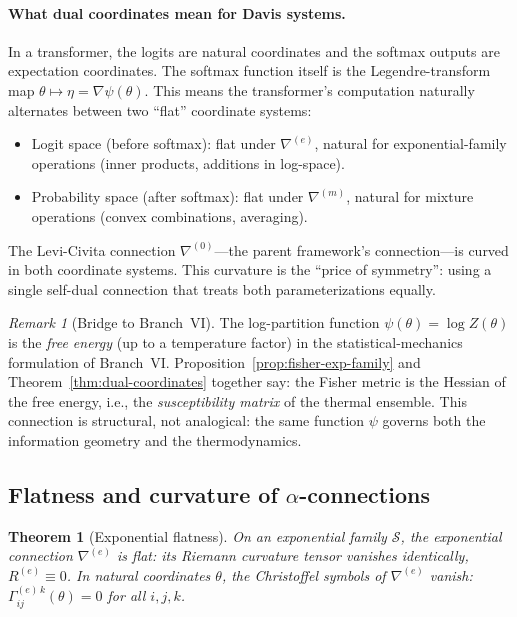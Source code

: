 \documentclass[11pt]{article}
\newtheorem{theorem}{Theorem}
\theoremstyle{remark}
\newtheorem{remark}{Remark}
\begin{document}
\paragraph{What dual coordinates mean for Davis systems.}
In a transformer, the logits are natural coordinates and the softmax outputs
are expectation coordinates.  The softmax function itself is the
Legendre-transform map $\theta \mapsto \eta = \nabla \psi(\theta)$.  This
means the transformer's computation naturally alternates between two
``flat'' coordinate systems:
\begin{itemize}[leftmargin=*]
  \item Logit space (before softmax): flat under $\nabla^{(e)}$, natural for
  exponential-family operations (inner products, additions in log-space).
  \item Probability space (after softmax): flat under $\nabla^{(m)}$, natural
  for mixture operations (convex combinations, averaging).
\end{itemize}
The Levi-Civita connection $\nabla^{(0)}$---the parent framework's
connection---is curved in both coordinate systems.  This curvature is the
``price of symmetry'': using a single self-dual connection that treats both
parameterizations equally.

\begin{remark}[Bridge to Branch~VI]\label{rmk:bridge-vi}
The log-partition function $\psi(\theta) = \log Z(\theta)$ is the
\emph{free energy} (up to a temperature factor) in the statistical-mechanics
formulation of Branch~VI.  Proposition~\ref{prop:fisher-exp-family} and
Theorem~\ref{thm:dual-coordinates} together say: the Fisher metric is the
Hessian of the free energy, i.e., the \emph{susceptibility matrix} of the
thermal ensemble.  This connection is structural, not analogical: the same
function $\psi$ governs both the information geometry and the thermodynamics.
\end{remark}

\subsection{Flatness and curvature of \texorpdfstring{$\alpha$}{alpha}-connections}

\begin{theorem}[Exponential flatness]\label{thm:e-flat}
On an exponential family $\mathcal{S}$, the exponential connection
$\nabla^{(e)}$ is flat: its Riemann curvature tensor vanishes identically,
$R^{(e)} \equiv 0$.  In natural coordinates $\theta$, the Christoffel symbols
of $\nabla^{(e)}$ vanish:
$\Gamma^{(e)\, k}_{ij}(\theta) = 0$ for all $i, j, k$.
\end{theorem}
\end{document}
